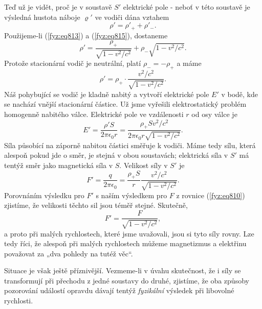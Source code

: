     Teď už je vidět, proč je v soustavě \(S'\) elektrické pole - neboť v této soustavě je výsledná
    hustota náboje \(\varrho'\) ve vodiči dána vztahem
    \begin{equation*}
      ρ′=ρ′_++ρ′_−.
    \end{equation*}
    Použijeme-li (\ref{fyz:eq813}) a (\ref{fyz:eq815}), dostaneme
    \begin{equation*}
      ρ′=\dfrac{ρ_+}{\sqrt{1−v^2/c^2}}+ ρ_−\sqrt{1−v^2/c^2}.
    \end{equation*}
    Protože stacionární vodič je neutrální, platí \(ρ_−=−ρ_+\) a máme
    \begin{equation}\label{fyz:eq816}
      ρ′=ρ_+\cdot\dfrac{v^2/c^2}{\sqrt{1−v^2/c^2}}.
    \end{equation}
    Náš pohybující se vodič je kladně nabitý a vytvoří elektrické pole \(E'\) v bodě, kde se nachází
    vnější stacionární částice. Už jsme vyřešili elektrostatický problém homogenně nabitého válce.
    Elektrické pole ve vzdálenosti \(r\) od osy válce je
    \begin{equation}\label{fyz:eq817}
      E′=\dfrac{ρ′S}{2πϵ_0r} = \dfrac{ρ_+Sv^2/c^2}{2πϵ_0r\sqrt{1−v^2/c^2}}.
    \end{equation}
    Síla působící na záporně nabitou částici směřuje k vodiči. Máme tedy sílu, která alespoň pokud
    jde o směr, je stejná v obou soustavách; elektrická síla v \(S'\) má tentýž směr jako magnetická
    síla v \(S\). Velikost síly v \(S'\) je 
    \begin{equation}\label{fyz:eq818}
      F′=\dfrac{q}{2πϵ_0} = \dfrac{ρ_+S}{r}\dfrac{v^2/c^2}{\sqrt{1−v^2/c^2}}.
    \end{equation}
    Porovnáním výsledku pro \(F'\) s naším výsledkem pro \(F\) z rovnice (\ref{fyz:eq810}) zjistíme,
    že velikosti těchto sil jsou téměř stejné. Skutečně,
    \begin{equation}\label{fyz:eq819}
      F′=\dfrac{F}{\sqrt{1−v^2/c^2}},
    \end{equation}
    a proto při malých rychlostech, které jsme uvažovali, jsou si tyto síly rovny. Lze tedy říci, že
    alespoň při malých rychlostech můžeme magnetizmus a elektřinu považovat za „dva pohledy na tutéž
    věc“.

    Situace je však ještě příznivější. Vezmeme-li v úvahu skutečnost, že i síly se transformují při
    přechodu z jedné soustavy do druhé, zjistíme, že oba způsoby pozorování událostí opravdu dávají
    tentýž \emph{fyzikální} výsledek při libovolné rychlosti.

